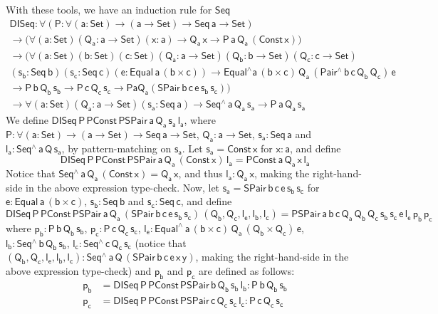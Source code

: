 \documentclass[acmsmall,screen,review,anonymous]{acmart}
\theoremstyle{definition}
\begin{document}
With these tools, we have an induction rule for $\mathsf{Seq}$
\begin{multline}
\mathsf{DISeq : \forall (P : \forall (a : Set) \to (a \to Set) \to Seq\,a \to Set)} \\
\mathsf{\to \big( \forall (a : Set) (Q_a : a \to Set) (x : a) \to Q_a\,x \to P\,a\,Q_a\,(Const\,x) \big)} \\
\mathsf{\to \big( \forall (a : Set) (b : Set) (c : Set)
	(Q_a : a \to Set) (Q_b : b \to Set) (Q_c : c \to Set)} \\
	\mathsf{(s_b : Seq\,b) (s_c : Seq\,c) (e : Equal\,a\,(b \times c))
	\to Equal^{\wedge} a\, (b \times c)\, Q_a\, (Pair^{\wedge}\,b\,c\,Q_b\,Q_c)\, e} \\
	\mathsf{\to P\,b\,Q_b\,s_b \to P\,c\,Q_c\,s_c
	\to P a Q_a ( SPair\,b\,c\,e\,s_b\,s_c ) \big)} \\
\mathsf{\to \forall (a : Set)(Q_a : a \to Set)(s_a : Seq\,a) \to Seq^{\wedge}\,a\,Q_a\,s_a \to P\,a\,Q_a\,s_a}
\end{multline}
We define $\mathsf{DISeq\,P\,PConst\,PSPair\,a\,Q_a\,s_a\,l_a}$,
where
$\mathsf{P : \forall (a : Set) \to (a \to Set) \to Seq\,a \to Set}$,
$\mathsf{Q_a : a \to Set}$, $\mathsf{s_a : Seq\,a}$
and $\mathsf{l_a : Seq^{\wedge}\,a\,Q\,s_a}$,
by pattern-matching on $\mathsf{s_a}$.
Let $\mathsf{s_a = Const\,x}$ for $\mathsf{x : a}$, and define
\[
\mathsf{DISeq\,P\,PConst\,PSPair\,a\,Q_a\,(Const\,x)\,l_a = PConst\,a\,Q_a\,x\,l_a}
\]
Notice that $\mathsf{Seq^{\wedge}\,a\,Q_a\,(Const\,x) = Q_a\,x}$, and thus $\mathsf{l_a : Q_a\,x}$,
making the right-hand-side in the above expression type-check.
Now, let $\mathsf{s_a = SPair\,b\,c\,e\,s_b\,s_c}$
for $\mathsf{e : Equal\,a\,(b \times c)}$, $\mathsf{s_b : Seq\,b}$ and $\mathsf{s_c : Seq\,c}$,
and define
\[
\mathsf{DISeq\,P\,PConst\,PSPair\,a\,Q_a\,(SPair\,b\,c\,e\,s_b\,s_c)\,(Q_b, Q_c, l_e, l_b, l_c)
	= PSPair\,a\,b\,c\,Q_a\,Q_b\,Q_c\,s_b\,s_c\,e\,l_e\,p_b\,p_c}
\]
where
$\mathsf{p_b : P\,b\,Q_b\,s_b}$, $\mathsf{p_c : P\,c\,Q_c\,s_c}$,
$\mathsf{l_e : Equal^{\wedge}\,a\, (b \times c)\, Q_a\, (Q_b \times Q_c) \, e}$,
$\mathsf{l_b : Seq^{\wedge}\,b\,Q_b\,s_b}$,
$\mathsf{l_c : Seq^{\wedge}\,c\,Q_c\,s_c}$
(notice that $\mathsf{(Q_b, Q_c, l_e, l_b, l_c) : Seq^{\wedge}\,a\,Q\,(SPair\,b\,c\,e\,x\,y)}$,
making the right-hand-side in the above expression type-check)
and $\mathsf{p_b}$ and $\mathsf{p_c}$ are defined as follows:
\begin{align*}
\mathsf{p_b} &=\mathsf{DISeq\,P\,PConst\,PSPair\,b\,Q_b\,s_b\,l_b : P\,b\,Q_b\,s_b} \\
\mathsf{p_c} &=\mathsf{DISeq\,P\,PConst\,PSPair\,c\,Q_c\,s_c\,l_c : P\,c\,Q_c\,s_c}
\end{align*}
\end{document}
